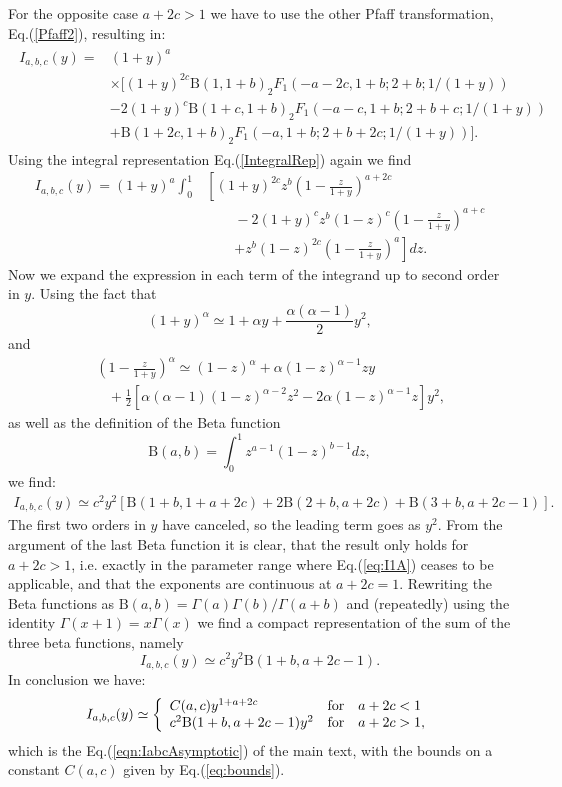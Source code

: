 For the opposite case $a+2c>1$ we have to use the other Pfaff transformation, Eq.(\ref{Pfaff2}), resulting in:
\begin{align}
\begin{split}
 I_{a,b,c}(y) = &(1+y)^{a} \\
 & \times \big[  (1+y)^{2c} \mathrm{B}(1,1+b)  _2F_1 \left(-a-2c,1+b;2+b; 1/(1+y) \right)  \\ 
& -2 (1+y)^{c} \mathrm{B}(1+c, 1+b)  _2F_1 \left(-a-c,1+b;2+b+c; 1/(1+y) \right)   \\ 
& +  \mathrm{B}(1+2c , 1+b)  _2F_1 \left(-a,1+b;2+b+2c;1/(1+y) \right) \big]. 
\end{split}
\end{align} 
%
Using the integral representation Eq.(\ref{IntegralRep}) again we find 
\begin{align}
 I_{a,b,c}(y) = (1+y)^{a} \int_0^1 & \left[  (1+y)^{2c} z^b \left( 1-\frac{z}{1+y} \right)^{a+2c}   \right. \nonumber\\
& \qquad -2 (1+y)^{c} z^b (1-z)^{c} \left( 1-\frac{z}{1+y} \right)^{a+c} \nonumber  \\ 
& \qquad \left. + z^b (1-z)^{2c} \left( 1-\frac{z}{1+y} \right)^{a}  \right] dz. \label{eqn:Iabc3}
\end{align} 
Now we expand the expression in each term of the integrand up to second order in $y$. Using the fact that 
\[
(1+y)^{\alpha} \simeq 1 + \alpha y + \frac{\alpha(\alpha-1)}{2} y^2 ,
\]
and 
\begin{eqnarray*}
&& \left( 1-\frac{z}{1+y} \right)^{\alpha} \simeq (1-z)^{\alpha} +  \alpha (1-z)^{\alpha-1} z y \\
&& \;\;\; + \frac{1}{2} \left[ \alpha (\alpha-1) (1-z)^{\alpha-2} z^2 -2 \alpha (1-z)^{\alpha-1}z \right] y^2,
\end{eqnarray*}
as well as the definition of the Beta function
\[
\mathrm{B}(a,b) = \int^1_0 z^{a-1} (1-z)^{b-1} dz ,
\]
we find:
\begin{eqnarray*}
 I_{a,b,c}(y) \simeq c^2 y^2 [ \mathrm{B}(1+b,1+a+2c)+2\mathrm{B}(2+b,a+2c) + \mathrm{B}(3+b,a+2c-1)].
\end{eqnarray*}
The first two orders in $y$ have canceled, so the leading term goes as $y^2$. From the argument of the last Beta function it is clear, that the result only holds for $a+2c>1$, 
i.e. exactly in the parameter range where Eq.(\ref{eq:I1A}) ceases to be applicable, and that the exponents are continuous at $a+2c=1$. 
Rewriting the Beta functions as $\mathrm{B}(a,b) = \Gamma(a) \Gamma(b)/ \Gamma(a+b)$ and (repeatedly) using the identity $\Gamma(x+1) = x \Gamma(x)$ we find a compact representation
of the sum of the three beta functions, namely 
\begin{equation}
 I_{a,b,c}(y) \simeq c^2 y^2 \mathrm{B}(1+b,a+2c-1).
\end{equation}
In conclusion we have:
\[
I_{a,b,c}(y) \simeq \left\{ \begin{array}{l l l}
C(a,c) y^{1+a+2c} & \mathrm{for} & a+2c< 1 \\
 c^2 \mathrm{B}(1+b,a+2c-1) y^2  & \mathrm{for} & a+2c> 1, 
\end{array} \right.
\]
which is the Eq.(\ref{eqn:IabcAsymptotic}) of the main text, with the bounds on a constant $C(a,c)$ given by Eq.(\ref{eq:bounds}). 